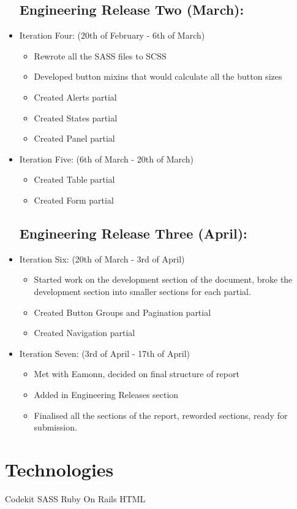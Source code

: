 \begin{itemize}
	\subsection*{Engineering Release Two (March):}
	\item Iteration Four: (20th of February - 6th of March)\begin{itemize} 
	\item Rewrote all the \gls{SASS} files to \gls{SCSS}
	\item Developed button mixins that would calculate all the button sizes
	\item Created Alerts partial
	\item Created States partial
	\item Created Panel partial
	\end{itemize}
	\item Iteration Five: (6th of March - 20th of March) \begin{itemize}
	\item Created Table partial
	\item Created Form partial
	\end{itemize}
	\subsection*{Engineering Release Three (April):}
	\item Iteration Six: (20th of March - 3rd of April)\begin{itemize}
	\item Started work on the development section of the document, broke the development section into smaller sections for each partial. 
	\item Created Button Groups and Pagination partial
	\item Created Navigation partial
	\end{itemize}
		\item Iteration Seven: (3rd of April - 17th of April)\begin{itemize}
	\item Met with Eamonn, decided on final structure of report
	\item Added in Engineering Releases section
	\item Finalised all the sections of the report, reworded sections, ready for submission.
	\end{itemize}	
\end{itemize}

\newpage
\section*{Technologies}

Codekit
SASS
Ruby On Rails
HTML
